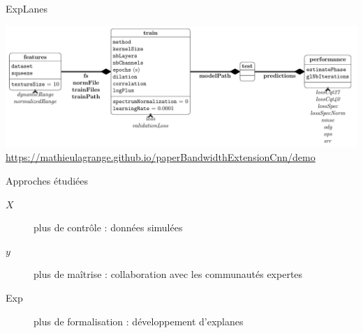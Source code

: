 \begin{frame}{ExpLanes}

  \begin{center}
  \includegraphics[width=\columnwidth]{figures/factors} \\
  \tiny  \url{https://mathieulagrange.github.io/paperBandwidthExtensionCnn/demo}
  \end{center}
\end{frame}

\begin{frame}{Approches étudiées}
\begin{center}
\end{center}
\vspace{.8cm}
\begin{description}
\item[$X$] plus de contrôle : données simulées
\item[$y$] plus de maîtrise : collaboration avec les communautés expertes
\item[Exp] plus de formalisation : développement d'explanes
\end{description}
\end{frame}
